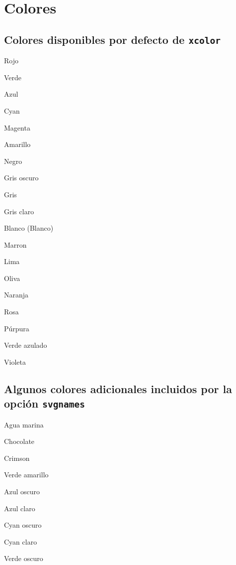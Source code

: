 \documentclass{article}
\begin{document}
\section{Colores}

\subsection{Colores disponibles por defecto de \texttt{xcolor}}

{\color{red} Rojo}

{\color{green} Verde}

{\color{blue} Azul}

{\color{cyan} Cyan}

{\color{magenta} Magenta}

{\color{yellow} Amarillo}

{\color{black} Negro}

{\color{darkgray} Gris oscuro}

{\color{gray} Gris}

{\color{lightgray} Gris claro}

{\color{white} Blanco} (Blanco)

{\color{brown} Marron}

{\color{lime} Lima}

{\color{olive} Oliva}

{\color{orange} Naranja}

{\color{pink} Rosa}

{\color{purple} Púrpura}

{\color{teal} Verde azulado}

{\color{violet} Violeta}

\subsection{Algunos colores adicionales incluidos por la opción \texttt{svgnames}}

{\color{Aquamarine} Agua marina}

{\color{Chocolate} Chocolate}

{\color{Crimson} Crimson}

{\color{GreenYellow} Verde amarillo}

{\color{DarkBlue} Azul oscuro}

{\color{LightBlue} Azul claro}

{\color{DarkCyan} Cyan oscuro}

{\color{LightCyan} Cyan claro}

{\color{DarkGreen} Verde oscuro}
\end{document}
